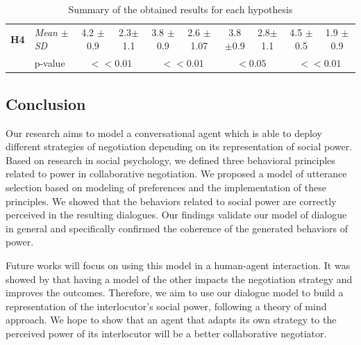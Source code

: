 \documentclass{llncs}
\begin{document}
\begin{table}[t]
{\begin{tabular}{|ll|c|c|c|c|c|c|c|c|}
						
						\newline \multirow{2}{*} {\textbf{H4}} & \multicolumn{1}{|l|}{ \textit{Mean} $\pm$ \textit{SD} } & 4.2 $\pm$ 0.9 & 2.3$\pm$ 1.1  & 3.8 $\pm$0.9 & 2.6 $\pm$1.07 & 3.8 $\pm$0.9  & 2.8$\pm$ 1.1  & 4.5 $\pm$0.5  & 1.9 $\pm$ 0.9\\
						\cline{2-10}
						\newline & \multicolumn{1}{|l|}{p-value} & \multicolumn{2}{c|}{ $<<0.01$} & \multicolumn{2}{c|}{ $<<0.01$} & \multicolumn{2}{c|}{ $<0.05$}& \multicolumn{2}{c|}{ $<<0.01$}\\
						\hline	
					\end{tabular}
				}
				\caption{Summary of the obtained results for each hypothesis}
				\label{res}
			\end{table}
			
			\subsection{Conclusion}
			
			Our research aims to model a conversational agent which is able to deploy different strategies of negotiation depending on its representation of social power. Based on research in social psychology, we defined three behavioral principles related to power in collaborative negotiation. We proposed a model of utterance selection based on modeling of preferences and the implementation of these principles. We showed that the behaviors related to social power are correctly perceived in the resulting dialogues. Our findings validate our model of dialogue in general and specifically confirmed the coherence of the generated behaviors of power.
			
			Future works will focus on using this model in a human-agent interaction. It was showed by \cite{klatt2011negotiations} that having a model of the other impacts the negotiation strategy and improves the outcomes. Therefore, we aim to use our dialogue model to build a representation of the interlocutor's social power, following a theory of mind approach. We hope to show that an agent that adapts its own strategy to the perceived power of its interlocutor will be a better collaborative negotiator.		
			
			
			
			\scriptsize{	
				
				}
			
			
			
		
\end{document}
